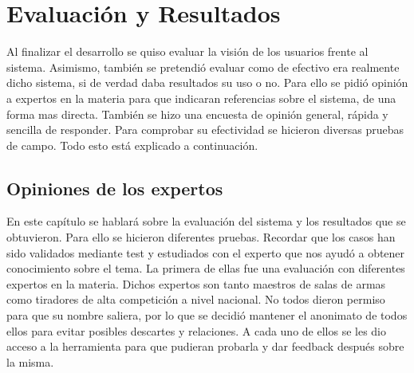 \chapter{Evaluación y Resultados}
\label{cap:Evaluación y resultados}

Al finalizar el desarrollo se quiso evaluar la visión de los usuarios frente al sistema.
Asimismo, también se pretendió evaluar como de efectivo era realmente dicho sistema,
si de verdad daba resultados su uso o no. Para ello se pidió opinión a expertos en la materia
para que indicaran referencias sobre el sistema, de una forma mas directa. También se hizo
una encuesta de opinión general, rápida y sencilla de responder. Para comprobar su efectividad
se hicieron diversas pruebas de campo. Todo esto está explicado a continuación.


\section{Opiniones de los expertos}

En este capítulo se hablará sobre la evaluación del sistema y los resultados que se obtuvieron.
Para ello se hicieron diferentes pruebas. Recordar que los casos han sido validados mediante
test y estudiados con el experto que nos ayudó a obtener conocimiento sobre el tema.
La primera de ellas fue una evaluación con diferentes
expertos en la materia. Dichos expertos son tanto maestros de salas de armas como tiradores
de alta competición a nivel nacional. No todos dieron permiso para que su nombre saliera, por
lo que se decidió mantener el anonimato de todos ellos para evitar posibles descartes y relaciones.
A cada uno de ellos se les dio acceso a la herramienta para que pudieran probarla y dar feedback
después sobre la misma.

